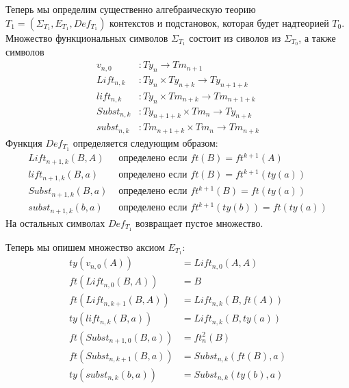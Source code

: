 \documentclass{amsart}
\theoremstyle{definition}
\theoremstyle{remark}
\numberwithin{figure}{section}
\begin{document}
Теперь мы определим существенно алгебраическую теорию $T_1 = (\Sigma_{T_1}, E_{T_1}, Def_{T_1})$ контекстов и подстановок, которая будет надтеорией $T_0$.
Множество функциональных символов $\Sigma_{T_1}$ состоит из сиволов из $\Sigma_{T_0}$, а также символов
\begin{align*}
v_{n,0}     & : Ty_n \to Tm_{n+1} \\
Lift_{n,k}  & : Ty_n \times Ty_{n+k} \to Ty_{n+1+k} \\
lift_{n,k}  & : Ty_n \times Tm_{n+k} \to Tm_{n+1+k} \\
Subst_{n,k} & : Ty_{n+1+k} \times Tm_n \to Ty_{n+k} \\
subst_{n,k} & : Tm_{n+1+k} \times Tm_n \to Tm_{n+k}
\end{align*}
Функция $Def_{T_1}$ определяется следующим образом:
\begin{align*}
Lift_{n+1,k}(B, A)  & \text{ определено если } ft(B) = ft^{k+1}(A) \\
lift_{n+1,k}(B, a)  & \text{ определено если } ft(B) = ft^{k+1}(ty(a)) \\
Subst_{n+1,k}(B, a) & \text{ определено если } ft^{k+1}(B) = ft(ty(a)) \\
subst_{n+1,k}(b, a) & \text{ определено если } ft^{k+1}(ty(b)) = ft(ty(a))
\end{align*}
На остальных символах $Def_{T_1}$ возвращает пустое множество.

\begin{comment}
Мы определяем производные термы $v_{n,i} : Ty_n \to Tm_{n+1}$ для любого $1 \leq i \leq n$, $Lift^i_{n,k} : Ty_{n+i-1} \times Ty_{n+k} \to Ty_{n+i+k}$ и $lift^i : Ty_{n+i-1} \times Tm_{n+k} \to Tm_{n+i+k}$ следующим образом:
\begin{align*}
v_{n+1,i+1}(A)         & := lift_{n+1,0}(A, v_{n,i}(ft_n(A))) \\
Lift^1_{n,k}(B, A)     & := Lift_{n,k}(B, A) \\
Lift^{i+1}_{n,k}(B, A) & := Lift_{n+i,k}(B, Lift^i_{n,k}(ft(B), A)) \\
lift^1_{n,k}(B, a)     & := lift_{n,k}(B, a) \\
lift^{i+1}_{n,k}(B, a) & := lift_{n+i,k}(B, lift^i_{n,k}(ft(B), a))
\end{align*}
Мы будем, как правило, опускать $n$ в нотации $v_{n,i}$, $Lift^i_{n,k}$ и $lift^i_{n,k}$ и писать просто $v_i$, $Lift^i_k$ и $lift^i_k$.
\end{comment}

Теперь мы опишем множество аксиом $E_{T_1}$:
\begin{align*}
ty(v_{n,0}(A))          & = Lift_{n,0}(A, A) \\
ft(Lift_{n,0}(B, A))    & = B \\
ft(Lift_{n,k+1}(B, A))  & = Lift_{n,k}(B, ft(A)) \\
ty(lift_{n,k}(B, a))    & = Lift_{n,k}(B, ty(a)) \\
ft(Subst_{n+1,0}(B, a)) & = ft^2_n(B) \\
ft(Subst_{n,k+1}(B, a)) & = Subst_{n,k}(ft(B), a) \\
ty(subst_{n,k}(b, a))   & = Subst_{n,k}(ty(b), a)
\end{align*}
\end{document}
